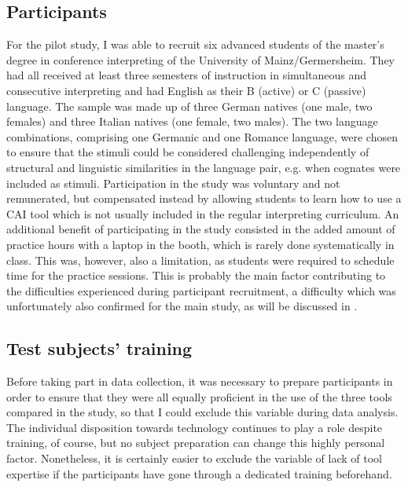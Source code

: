 \subsection{Participants} \label{sample_PS}
For the pilot study, I was able to recruit six advanced students of the master's degree in conference interpreting of the University of Mainz/Germersheim. They had all received at least three semesters of instruction in simultaneous and consecutive interpreting and had English as their B (active) or C (passive) language. The sample was made up of three German natives (one male, two females) and three Italian natives (one female, two males). The two language combinations, comprising one Germanic and one Romance language, were chosen to ensure that the stimuli could be considered challenging independently of structural and linguistic similarities in the language pair, e.g. when cognates were included as stimuli. Participation in the study was voluntary and not remunerated, but compensated instead by allowing students to learn how to use a CAI tool which is not usually included in the regular interpreting curriculum. An additional benefit of participating in the study consisted in the added amount of practice hours with a laptop in the booth, which is rarely done systematically in class. This was, however, also a limitation, as students were required to schedule time for the practice sessions. This is probably the main factor contributing to the difficulties experienced during participant recruitment, a difficulty which was unfortunately also confirmed for the main study, as will be discussed in .



\subsection{Test subjects' training} \label{testsubjects_training}
Before taking part in data collection, it was necessary to prepare participants in order to ensure that they were all equally proficient in the use of the three tools compared in the study, so that I could exclude this variable during data analysis. The individual disposition towards technology continues to play a role despite training, of course, but no subject preparation can change this highly personal factor. Nonetheless, it is certainly easier to exclude the variable of lack of tool expertise if the participants have gone through a dedicated training beforehand.

